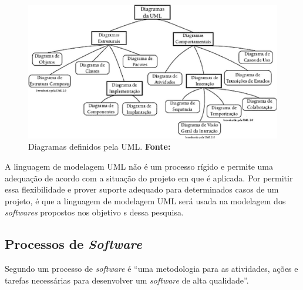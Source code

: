		\begin{figure}[h!]
			\centerline{\includegraphics[scale=0.8]{./imagens/imagem.png}}
				\caption[Principais Diagramas definidos pela UML.]{Diagramas definidos pela
				UML. \textbf{Fonte:}}
				\label{fig:exemplo4}
		\end{figure}
		
		\pagebreak
		\par A linguagem de modelagem UML não é um processo rígido e permite uma
		adequação de acordo com a situação do projeto em que é aplicada. Por permitir
		essa flexibilidade e prover suporte adequado para determinados casos de um
		projeto, é que a linguagem de modelagem UML será usada na modelagem dos
		\textit{softwares} propostos nos objetivo s dessa pesquisa.

	
	\subsection{Processos de \textit{Software}}
	
	
	\par Segundo  um processo de \textit{software} é
“uma metodologia para as atividades, ações e tarefas necessárias para
desenvolver um \textit{software} de alta qualidade”.

